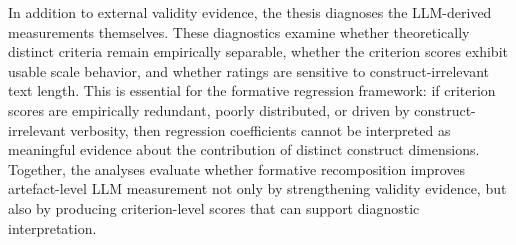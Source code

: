In addition to external validity evidence, the thesis diagnoses the LLM-derived measurements themselves. These diagnostics examine whether theoretically distinct criteria remain empirically separable, whether the criterion scores exhibit usable scale behavior, and whether ratings are sensitive to construct-irrelevant text length. This is essential for the formative regression framework: if criterion scores are empirically redundant, poorly distributed, or driven by construct-irrelevant verbosity, then regression coefficients cannot be interpreted as meaningful evidence about the contribution of distinct construct dimensions. Together, the analyses evaluate whether formative recomposition improves artefact-level LLM measurement not only by strengthening validity evidence, but also by producing criterion-level scores that can support diagnostic interpretation.















